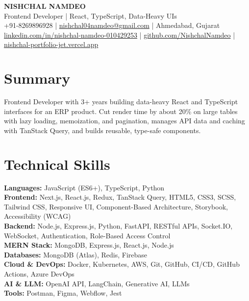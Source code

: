 \documentclass[a4paper,10pt]{article}
\begin{document}
\begin{center}
  {\LARGE \textbf{NISHCHAL NAMDEO}}\\[3pt]
  Frontend Developer | React, TypeScript, Data-Heavy UIs\\[3pt]
  +91-8269896928 | \href{mailto:nishchal04namdeo@gmail.com}{nishchal04namdeo@gmail.com} | Ahmedabad, Gujarat\\[2pt]
  \href{https://www.linkedin.com/in/nishchal-namdeo-010429253/}{linkedin.com/in/nishchal-namdeo-010429253} |
  \href{https://github.com/NishchalNamdeo}{github.com/NishchalNamdeo} |
  \href{https://nishchal-portfolio-jet.vercel.app/}{nishchal-portfolio-jet.vercel.app}
\end{center}

\section{Summary}
Frontend Developer with 3+ years building data-heavy React and TypeScript interfaces for an ERP product. Cut render time by about 20\% on large tables with lazy loading, memoization, and pagination, manages API data and caching with TanStack Query, and builds reusable, type-safe components.

\section{Technical Skills}
\textbf{Languages:} JavaScript (ES6+), TypeScript, Python\\
\textbf{Frontend:} Next.js, React.js, Redux, TanStack Query, HTML5, CSS3, SCSS, Tailwind CSS, Responsive UI, Component-Based Architecture, Storybook, Accessibility (WCAG)\\
\textbf{Backend:} Node.js, Express.js, Python, FastAPI, RESTful APIs, Socket.IO, WebSocket, Authentication, Role-Based Access Control\\
\textbf{MERN Stack:} MongoDB, Express.js, React.js, Node.js\\
\textbf{Databases:} MongoDB (Atlas), Redis, Firebase\\
\textbf{Cloud \& DevOps:} Docker, Kubernetes, AWS, Git, GitHub, CI/CD, GitHub Actions, Azure DevOps\\
\textbf{AI \& LLM:} OpenAI API, LangChain, Generative AI, LLMs\\
\textbf{Tools:} Postman, Figma, Webflow, Jest

\end{document}
